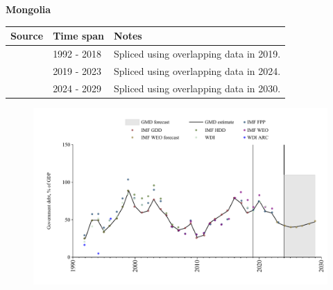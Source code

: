 \documentclass[12pt,a4paper,landscape]{article}
\begin{document}
\begin{adjustbox}{max totalsize={\paperwidth}{\paperheight},center}
\begin{minipage}[t][\textheight][t]{\textwidth}
\vspace*{0.5cm}
{}
\begin{center}
{\Large\bfseries Mongolia}
\end{center}
\vspace{0.5cm}
\begin{table}[H]
\centering
\small
\begin{tabular}{|l|l|l|}
\hline
\textbf{Source} & \textbf{Time span} & \textbf{Notes} \\
\hline
\rowcolor{white}\cite{IMF_GDD}& 1992 - 2018 &Spliced using overlapping data in 2019.\\
\rowcolor{lightgray}\cite{IMF_FPP}& 2019 - 2023 &Spliced using overlapping data in 2024.\\
\rowcolor{white}\cite{IMF_WEO_forecast}& 2024 - 2029 &Spliced using overlapping data in 2030.\\
\hline
\end{tabular}
\end{table}
\begin{figure}[H]
\centering
\includegraphics[width=\textwidth,height=0.6\textheight,keepaspectratio]{graphs/MNG_govdebt_GDP.pdf}
\end{figure}
\end{minipage}
\end{adjustbox}
\end{document}
